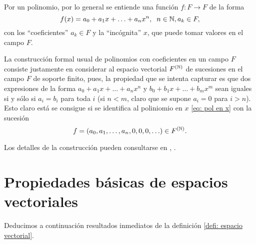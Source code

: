 \begin{nota}
	Por un polinomio, por lo general se entiende una función
	$f: F \longrightarrow F$
	de la forma 
	\begin{equation}
		\label{eq: pol en x}
	f(x) = a_{0} + a_{1}x + \ldots + a_{n}x^{n}, \hspace{0.2cm}
	n \in \mathbb{N}, a_{k} \in F,
	\end{equation}
	con los ``coeficientes'' $a_{k} \in F$ y la ``incógnita''
	$x$, que puede tomar valores en el campo $F$.
	
	La construcción formal usual de polinomios con coeficientes en un campo $F$
	consiste justamente en considerar al espacio vectorial $F^{(\mathbb{N})}$ de sucesiones
	en el campo $F$ de soporte finito, pues, la propiedad que se intenta capturar
	es que dos expresiones de la forma 
		$a_{0} + a_{1}x + \ldots + a_{n}x^{n}$ y
		$b_{0} + b_{1}x + \ldots + b_{m}x^{m}$ sean iguales si y sólo si 
		$a_{i} = b_{i}$ para toda $i$ (si $n < m$, claro que se supone $a_{i} = 0$
		para $i > n$). 
	Esto claro está se consigue si se identifica al poliniomio en $x$
	\eqref{eq: pol en x} con la sucesión 
	\[
	f = (a_{0}, a_{1}, \ldots, a_{n}, 0, 0, 0, \ldots) \in F^{(\mathbb{N})}.
	\]
	
	Los detalles de la construcción pueden consultarse en 
	\cite{Jacobson}, \cite{Rotman}.
\end{nota}




\section{Propiedades básicas de espacios vectoriales}
Deducimos a continuación resultados inmediatos de la definición
\ref{defi: espacio vectorial}.


